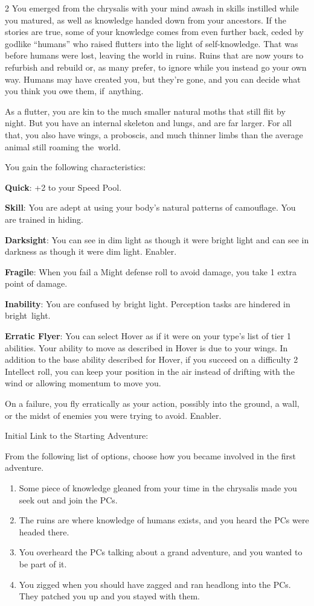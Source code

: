 \begin{multicols}{2}
You emerged from the chrysalis with your mind awash in skills instilled while you matured, as well as knowledge handed down from your ancestors. If the stories are true, some of your knowledge comes from even further back, ceded by godlike “humans” who raised flutters into the light of self-knowledge. That was before humans were lost, leaving the world in ruins. Ruins that are now yours to refurbish and rebuild or, as many prefer, to  ignore while you instead go your own way. Humans may have created you, but they’re gone, and you can decide what you think you owe them, if anything.

As a flutter, you are kin to the much smaller natural moths that still flit by night. But you have an internal skeleton and lungs, and are far larger. For all that, you also have wings, a proboscis, and much thinner limbs than the average animal still roaming the world.

You gain the following characteristics:

\textbf{Quick}: +2 to your Speed Pool.

\textbf{Skill}: You are adept at using your body’s natural patterns of camouflage. You are trained in hiding.

\textbf{Darksight}: You can see in dim light as though it were bright light and can see in darkness as though it were dim light. Enabler.

\textbf{Fragile}: When you fail a Might defense roll to avoid damage, you take 1 extra point of damage.

\textbf{Inability}: You are confused by bright light. Perception tasks are hindered in bright light.

\textbf{Erratic Flyer}: You can select Hover as if it were on your type’s list of tier 1 abilities. Your ability to move as described in Hover is due to your wings. In addition to the base ability described for Hover, if you succeed on a difficulty 2 Intellect roll, you can keep your position in the air instead of drifting with the wind or allowing momentum to move you.

On a failure, you fly erratically as your action, possibly into the ground, a wall, or the midst of enemies you were trying to avoid. Enabler.

Initial Link to the Starting Adventure:

From the following list of options, choose how you became involved in the first adventure.
\begin{enumerate}
\item  Some piece of knowledge gleaned from your time in the chrysalis made you seek out and join the PCs.
\item  The ruins are where knowledge of humans exists, and you heard the PCs were headed there.
\item  You overheard the PCs talking about a grand adventure, and you wanted to be part of it.
\item  You zigged when you should have zagged and ran headlong into the PCs. They patched you up and you stayed with them.
\end{enumerate}


\end{multicols}
